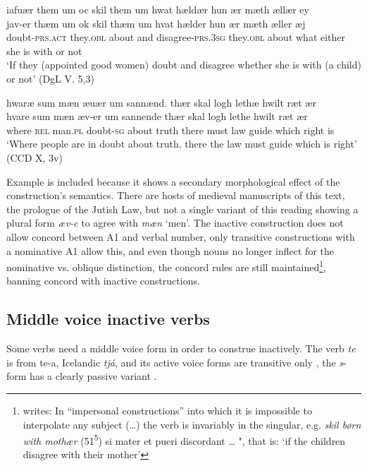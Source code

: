 \documentclass[output=paper]{langscibook}
\begin{document}
\ea \label{ex:heltoft:9a} \ea
    \glll iafuær them um oc skil them um hwat hældær hun ær mæth ællær ey \\
         jav-er        thæm    um   ok    skil          thæm   um   hvat  hælder   hun   ær    mæth  æller  æj\\
         doubt-\textsc{prs.act}   they.\textsc{obl}   about   and   disagree-\textsc{prs.3sg}    they.\textsc{obl} about  what   either    she    is    with  or    not\\
    \glt `If they (appointed good women) doubt and disagree whether she is with (a child) or not' (DgL V. 5,3) 

\ex \label{ex:heltoft:9b}
    \glll hwaræ sum mæn æuær um sannænd. thær skal logh lethæ hwilt ræt ær \\
         hvare  sum  mæn    æv-er    um    sannende  thær   skal  logh  lethe hwilt     ræt   ær\\
         where   \textsc{rel}  man.\textsc{pl}  doubt-\textsc{sg}   about  truth    there   must  law  guide which    right  is\\
    \glt  `Where people are in doubt about truth, there the law must guide which is right' (CCD X, 3v)       
\z\z 

Example  is included because it shows a secondary morphological effect of the construction's semantics. There are hosts of medieval manuscripts of this text, the prologue of the Jutish Law, but not a single variant of this reading showing a plural form \textit{æv-e} to agree with \textit{mæn} `men'. The inactive construction does not allow concord between A1 and verbal number, only transitive constructions with a nominative A1 allow this, and even though nouns no longer inflect for the nominative vs. oblique distinction, the concord rules are still maintained\footnote{\citet[166]{Bjerrum1949} writes: In ``impersonal constructions” into which it is impossible to interpolate any subject (…) the verb is invariably in the singular, e.g. \textit{skil børn with mothær} (51\textsuperscript{5}) si mater et pueri discordant … ", that is: `if the children disagree with their mother'}, banning concord with inactive constructions.

\subsection{Middle voice inactive verbs} \label{heltoft:2.2}\largerpage[-1]

Some verbs need a middle voice form in order to construe inactively. The verb \textit{te} is from te-a, Icelandic \textit{tjá}, and its active voice forms are transitive only , the \textit{s}{}-form has a clearly passive variant .
\end{document}
